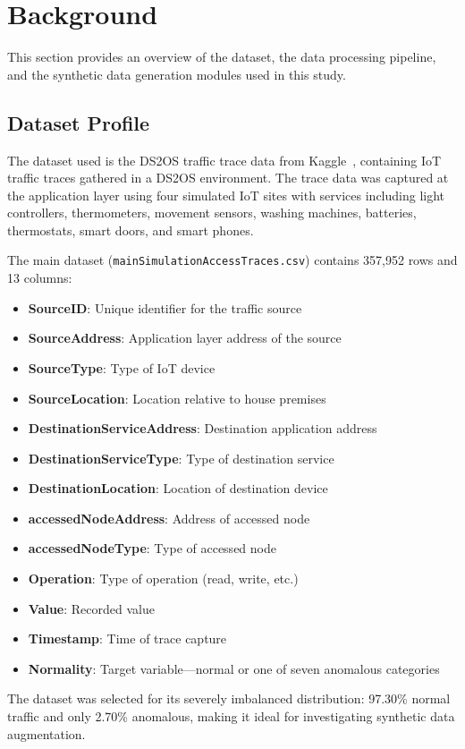 \documentclass[conference]{IEEEtran}
\begin{document}
\section{Background}
This section provides an overview of the dataset, the data processing pipeline, and the synthetic data generation modules used in this study.

\subsection{Dataset Profile}
The dataset used is the DS2OS traffic trace data from Kaggle~\cite{ds2os}, containing IoT traffic traces gathered in a DS2OS environment. The trace data was captured at the application layer using four simulated IoT sites with services including light controllers, thermometers, movement sensors, washing machines, batteries, thermostats, smart doors, and smart phones.

The main dataset (\texttt{mainSimulationAccessTraces.csv}) contains 357,952 rows and 13 columns:
\begin{itemize}
    \item \textbf{SourceID}: Unique identifier for the traffic source
    \item \textbf{SourceAddress}: Application layer address of the source
    \item \textbf{SourceType}: Type of IoT device
    \item \textbf{SourceLocation}: Location relative to house premises
    \item \textbf{DestinationServiceAddress}: Destination application address
    \item \textbf{DestinationServiceType}: Type of destination service
    \item \textbf{DestinationLocation}: Location of destination device
    \item \textbf{accessedNodeAddress}: Address of accessed node
    \item \textbf{accessedNodeType}: Type of accessed node
    \item \textbf{Operation}: Type of operation (read, write, etc.)
    \item \textbf{Value}: Recorded value
    \item \textbf{Timestamp}: Time of trace capture
    \item \textbf{Normality}: Target variable---normal or one of seven anomalous categories
\end{itemize}

The dataset was selected for its severely imbalanced distribution: 97.30\% normal traffic and only 2.70\% anomalous, making it ideal for investigating synthetic data augmentation.
\end{document}
